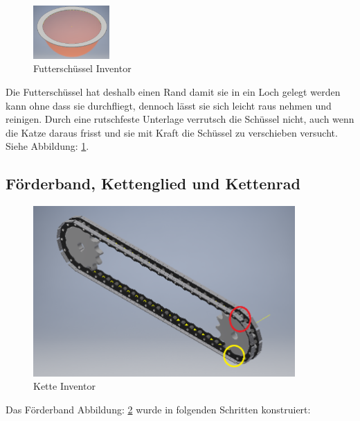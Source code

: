 \begin{figure}
\vspace{-20pt}
  \begin{center}
    \includegraphics[width=0.26\textwidth]{Bilder/Inventor/Schuessel}
  \end{center}
  \caption{Futterschüssel Inventor}
  \label{Futterschuessel_Inventor}
  \vspace{-40pt}
\end{figure}

Die Futterschüssel hat deshalb einen Rand damit sie in ein Loch gelegt werden kann ohne dass sie durchfliegt, dennoch lässt sie sich leicht raus nehmen und reinigen. Durch eine rutschfeste Unterlage verrutsch die Schüssel nicht, auch wenn die Katze daraus frisst und sie mit Kraft die Schüssel zu verschieben versucht. Siehe Abbildung: \ref{Futterschuessel_Inventor}.

\subsection{Förderband, Kettenglied und Kettenrad}

\begin{figure}[H]
\begin{center}
\includegraphics[width=10cm]{Bilder/Inventor/Kette}
\caption{Kette Inventor}
\label{Kette_Inventor} 
\end{center}
\end{figure}


Das Förderband Abbildung: \ref{Kette_Inventor} wurde in folgenden Schritten konstruiert: 


